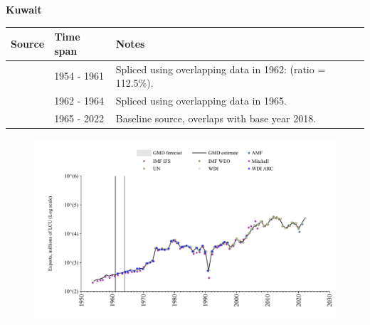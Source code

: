 \documentclass[12pt,a4paper,landscape]{article}
\begin{document}
\begin{adjustbox}{max totalsize={\paperwidth}{\paperheight},center}
\begin{minipage}[t][\textheight][t]{\textwidth}
\vspace*{0.5cm}
{}
\begin{center}
{\Large\bfseries Kuwait}
\end{center}
\vspace{0.5cm}
\begin{table}[H]
\centering
\small
\begin{tabular}{|l|l|l|}
\hline
\textbf{Source} & \textbf{Time span} & \textbf{Notes} \\
\hline
\rowcolor{white}\cite{Mitchell}& 1954 - 1961 &Spliced using overlapping data in 1962: (ratio = 112.5\%).\\
\rowcolor{lightgray}\cite{WDI_ARC}& 1962 - 1964 &Spliced using overlapping data in 1965.\\
\rowcolor{white}\cite{WDI}& 1965 - 2022 &Baseline source, overlaps with base year 2018.\\
\hline
\end{tabular}
\end{table}
\begin{figure}[H]
\centering
\includegraphics[width=\textwidth,height=0.6\textheight,keepaspectratio]{graphs/KWT_exports.pdf}
\end{figure}
\end{minipage}
\end{adjustbox}
\end{document}
